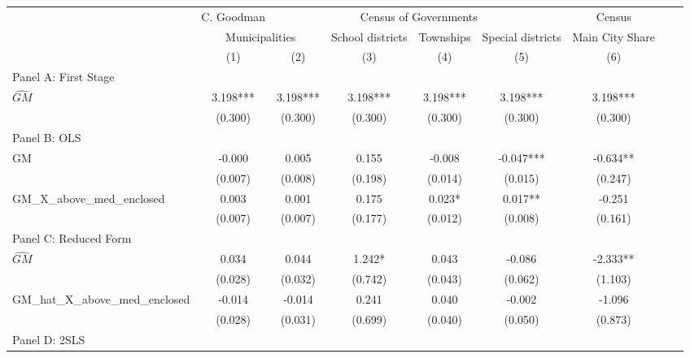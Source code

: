  \begin{tabular}{l*{8}{c}} \toprule
&\multicolumn{1}{c}{C. Goodman}&\multicolumn{4}{c}{Census of Governments}&\multicolumn{1}{c}{Census}\\\cmidrule(lr){2-2}\cmidrule(lr){3-6}\cmidrule(lr){7-7}
&\multicolumn{2}{c}{Municipalities}&\multicolumn{1}{c}{School districts}&\multicolumn{1}{c}{Townships}&\multicolumn{1}{c}{Special districts}&\multicolumn{1}{c}{Main City Share}\\\cmidrule(lr){2-3}\cmidrule(lr){4-6}\cmidrule(lr){7-7}
&\multicolumn{1}{c}{(1)}&\multicolumn{1}{c}{(2)}&\multicolumn{1}{c}{(3)}&\multicolumn{1}{c}{(4)}&\multicolumn{1}{c}{(5)}&\multicolumn{1}{c}{(6)}\\
\cmidrule(lr){1-7}
\multicolumn{6}{l}{Panel A: First Stage}\\
\cmidrule(lr){1-7}
$\widehat{GM}$  &    3.198***&    3.198***&    3.198***&    3.198***&    3.198***&    3.198***\\
                &  (0.300)   &  (0.300)   &  (0.300)   &  (0.300)   &  (0.300)   &  (0.300)   \\
\cmidrule(lr){1-7}
\multicolumn{6}{l}{Panel B: OLS}\\
\cmidrule(lr){1-7}
GM              &   -0.000   &    0.005   &    0.155   &   -0.008   &   -0.047***&   -0.634** \\
                &  (0.007)   &  (0.008)   &  (0.198)   &  (0.014)   &  (0.015)   &  (0.247)   \\
\addlinespace
GM\_X\_above\_med\_enclosed&    0.003   &    0.001   &    0.175   &    0.023*  &    0.017** &   -0.251   \\
                &  (0.007)   &  (0.007)   &  (0.177)   &  (0.012)   &  (0.008)   &  (0.161)   \\
\cmidrule(lr){1-7}
\multicolumn{6}{l}{Panel C: Reduced Form}\\
\cmidrule(lr){1-7}
$\widehat{GM}$  &    0.034   &    0.044   &    1.242*  &    0.043   &   -0.086   &   -2.333** \\
                &  (0.028)   &  (0.032)   &  (0.742)   &  (0.043)   &  (0.062)   &  (1.103)   \\
\addlinespace
GM\_hat\_X\_above\_med\_enclosed&   -0.014   &   -0.014   &    0.241   &    0.040   &   -0.002   &   -1.096   \\
                &  (0.028)   &  (0.031)   &  (0.699)   &  (0.040)   &  (0.050)   &  (0.873)   \\
\cmidrule(lr){1-7}
\multicolumn{6}{l}{Panel D: 2SLS}\\

\end{tabular}
